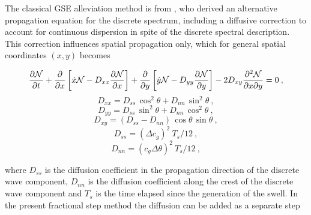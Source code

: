 
\vspace{\baselineskip} 


\noindent
The classical GSE alleviation method is from \cite{art:BH87}, who derived an
alternative propagation equation for the discrete spectrum, including a
diffusive correction to account for continuous dispersion in spite of the
discrete spectral description. This correction influences spatial propagation
only, which for general spatial coordinates $(x,y)$ becomes


\begin{equation}
\frac{\partial {\cal N}}{\partial t} +
\frac{\partial}{\partial x} \left [ \dot{x} {\cal N} 
           - D_{xx} \frac{\partial {\cal N}}{\partial x} \right ] +
\frac{\partial}{\partial y} \left [ \dot{y} {\cal N} 
           - D_{yy} \frac{\partial {\cal N}}{\partial y} \right ] -
2 D_{xy} \frac{\partial^2 {\cal N}}{\partial x \partial y} = 0
\: , \label{eq:d_bal_0}\end{equation}  \begin{equation}
D_{xx} = D_{ss} \, \cos^2 \theta + D_{nn} \, \sin^2 \theta
\: , \label{eq:Dxx} \end{equation} \begin{equation}
D_{yy} = D_{ss} \, \sin^2 \theta + D_{nn} \, \cos^2 \theta
\: , \label{eq:Dyy} \end{equation}  \begin{equation}
D_{xy} = ( D_{ss} - D_{nn} ) \, \cos \theta \, \sin \theta
\: , \label{eq:Dxy} \end{equation} \begin{equation}
D_{ss} = (\Delta c_g )^2 \: T_s / 12
\: , \label{eq:Dss} \end{equation} \begin{equation}
D_{nn} =  ( c_g \Delta \theta )^2 \: T_s / 12
\: , \label{eq:Dnn} \end{equation}

\noindent
where $D_{ss}$ is the diffusion coefficient in the propagation direction of
the discrete wave component, $D_{nn}$ is the diffusion coefficient along the
crest of the discrete wave component and $T_s$ is the time elapsed since the
generation of the swell. In the present fractional step method the diffusion
can be added as a separate step

